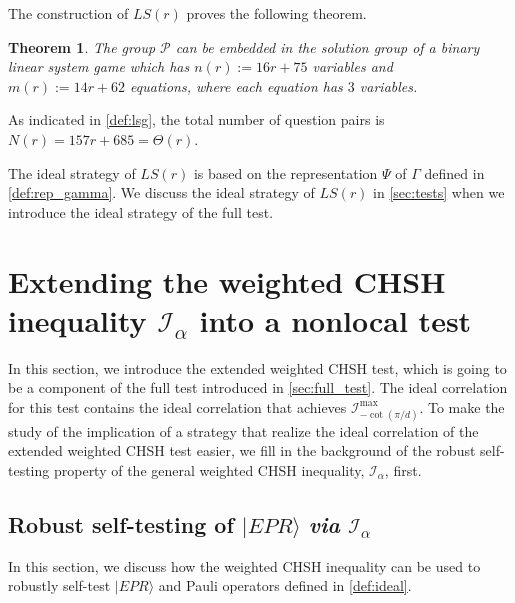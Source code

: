 \documentclass[11pt,letterpaper]{article}
\newcommand{\ket}[1]{|#1\rangle}
\newcommand{\1}{\mathbb{1}}
\newcommand{\Pg}{\mathcal{P}}
\newcommand{\LS}{LS}
\newcommand{\nr}{n(r)}
\newcommand{\mr}{m(r)}
\newcommand{\I}{\mathcal{I}}
\newtheorem{theorem}{Theorem}[section]
\newtheorem{proposition}[theorem]{Proposition}
\theoremstyle{definition}
\begin{document}
The construction of $\LS(r)$ proves the following theorem.
\begin{theorem}
	The group $\Pg$ can be embedded in the solution group of a binary linear system game which has
	$\nr := 16r+75$ variables and $\mr := 14r + 62$ equations, where each equation has $3$ variables.
\end{theorem}
As indicated in \cref{def:lsg}, the total
number of question pairs is $N(r) = 157r + 685 = \Theta(r)$.

The ideal strategy of $\LS(r)$ is based on
the representation $\Psi$ of $\Gamma$ defined in \cref{def:rep_gamma}.
We discuss the ideal strategy of $\LS(r)$ in \cref{sec:tests}
when we introduce the ideal strategy of the full test.


\section{Extending the weighted CHSH inequality $\I_\alpha$ into a nonlocal test}
\label{sec:ext_chsh}
In this section, we introduce the extended weighted CHSH test,
which is going to be a component of the full test introduced in \cref{sec:full_test}.
The ideal correlation for this test contains the ideal correlation that 
achieves $\I_{-\cot(\pi/d)}^{\max}$. 
To make the study of the implication of a strategy that realize 
the ideal correlation of the extended weighted CHSH test easier,
we fill in the background of the robust self-testing property of the
general weighted CHSH inequality, $\I_\alpha$, first.

\subsection{Robust self-testing of $\ket{EPR}$ \textit{via} $\I_\alpha$}
\label{sec:chsh}
In this section, we discuss how the weighted CHSH inequality can be used to robustly self-test $\ket{EPR}$ and Pauli operators defined in \cref{def:ideal}.
\end{document}

